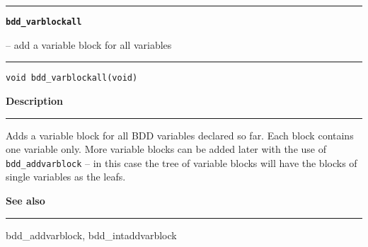 \vspace{8ex}
\begin{minipage}{\textwidth}

\noindent\begin{minipage}{\textwidth}
\rule{\textwidth}{0.5mm}
{\tt\bf bdd\_varblockall }
\--- add a variable block for all variables  \hspace{\fill}
\\\rule[1.5ex]{\textwidth}{0.5mm}
\end{minipage}

\noindent\begin{verbatim}
void bdd_varblockall(void) 
\end{verbatim}

\vspace{\parsep}\noindent
{\bf Description}\\\rule[1.5ex]{\textwidth}{0.2mm}\vspace{-1.5ex}\setlength{\parindent}{1em}
Adds a variable block for all BDD variables declared so far.
           Each block contains one variable only. More variable blocks
	   can be added later with the use of {\tt bdd\_addvarblock} --
	   in this case the tree of variable blocks will have the blocks
	   of single variables as the leafs. 

\vspace{\parsep}\vspace{\baselineskip}\noindent
{\bf See also}\\\rule[1.5ex]{\textwidth}{0.2mm}\vspace{-1.5ex}
bdd\_addvarblock, bdd\_intaddvarblock 
\end{minipage}
\vspace{8ex}
